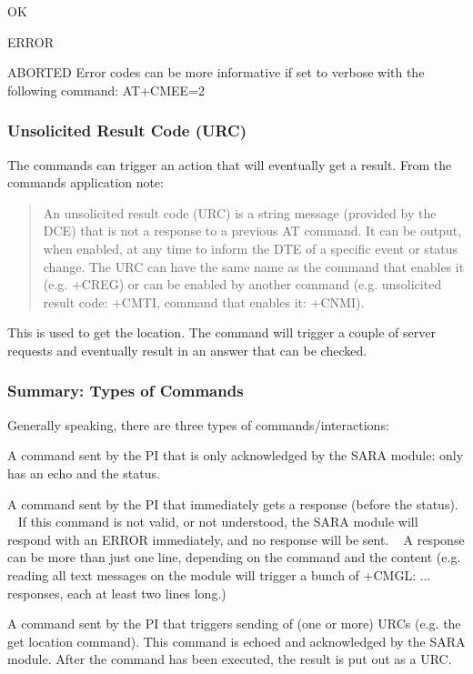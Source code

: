 \begin{DoxyItemize}
\item OK
\item E\+R\+R\+OR
\item A\+B\+O\+R\+T\+ED Error codes can be more informative if set to verbose with the following command\+: A\+T+\+C\+M\+EE=2
\end{DoxyItemize}

\subsubsection*{Unsolicited Result Code (U\+RC)}

The commands can trigger an action that will eventually get a result. From the commands application note\+:

\begin{quote}
An unsolicited result code (U\+RC) is a string message (provided by the D\+CE) that is not a response to a previous AT command. It can be output, when enabled, at any time to inform the D\+TE of a specific event or status change. The U\+RC can have the same name as the command that enables it (e.\+g. +\+C\+R\+EG) or can be enabled by another command (e.\+g. unsolicited result code\+: +\+C\+M\+TI, command that enables it\+: +\+C\+N\+MI). \end{quote}


This is used to get the location. The command will trigger a couple of server requests and eventually result in an answer that can be checked.

\subsubsection*{Summary\+: Types of Commands}

Generally speaking, there are three types of commands/interactions\+:
\begin{DoxyItemize}
\item A command sent by the PI that is only acknowledged by the S\+A\+RA module\+: only has an echo and the status.
\item A command sent by the PI that immediately gets a response (before the status). ~\newline
 If this command is not valid, or not understood, the S\+A\+RA module will respond with an E\+R\+R\+OR immediately, and no response will be sent. ~\newline
 A response can be more than just one line, depending on the command and the content (e.\+g. reading all text messages on the module will trigger a bunch of {\ttfamily +\+C\+M\+GL\+: ...} responses, each at least two lines long.)
\item A command sent by the PI that triggers sending of (one or more) U\+R\+Cs (e.\+g. the get location command). This command is echoed and acknowledged by the S\+A\+RA module. After the command has been executed, the result is put out as a U\+RC.
\end{DoxyItemize}

